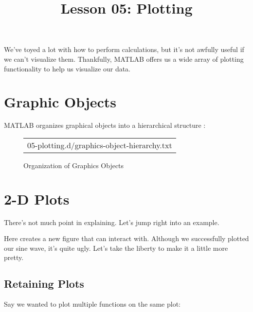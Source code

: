 \documentclass{article}
\title{Lesson 05: Plotting}
\begin{document}
\renderTitle

We've toyed a lot with how to perform calculations, but it's not awfully
useful if we can't visualize them.  Thankfully, MATLAB offers us a wide
array of plotting functionality to help us visualize our data.

\section{Graphic Objects}

MATLAB organizes graphical objects into a hierarchical structure%
:

\begin{figure}[!ht]
\Centering
\small
\begin{tabular}{c}
	{05-plotting.d/graphics-object-hierarchy.txt}
\end{tabular}
\caption{Organization of Graphics Objects}
\end{figure}

\section{2-D Plots}

There's not much point in explaining.  Let's jump right into an example.


Here  creates a new figure that  can interact with.  Although we
successfully plotted our sine wave, it's quite ugly.  Let's take the
liberty to make it a little more pretty.


\subsection{Retaining Plots}

Say we wanted to plot multiple functions on the same plot:

\newpage


\end{document}
